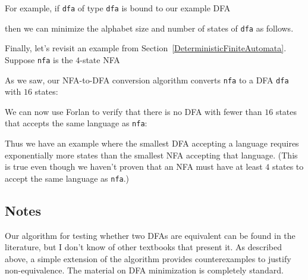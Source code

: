 For example, if \texttt{dfa} of type \texttt{dfa} is bound to our example
DFA
\begin{center}

\end{center}
then we can minimize the alphabet size and number of states of \texttt{dfa}
as follows.


Finally, let's revisit an example from
Section~\ref{DeterministicFiniteAutomata}. Suppose \texttt{nfa} is the
$4$-state NFA
\begin{center}

\end{center}
As we saw, our NFA-to-DFA conversion algorithm converts \texttt{nfa}
to a DFA \texttt{dfa} with $16$ states:



We can now use Forlan to verify that there is no DFA with fewer than
$16$ states that accepts the same language as \texttt{nfa}:



Thus we have an example where the smallest DFA accepting a language
requires exponentially more states than the smallest NFA accepting that
language. (This is true even though we haven't proven that an NFA
must have at least $4$ states to accept the same language as \texttt{nfa}.)

\subsection{Notes}

Our algorithm for testing whether two DFAs are equivalent can be found
in the literature, but I don't know of other textbooks that present
it.  As described above, a simple extension of the algorithm provides
counterexamples to justify non-equivalence.  The material on DFA
minimization is completely standard.

